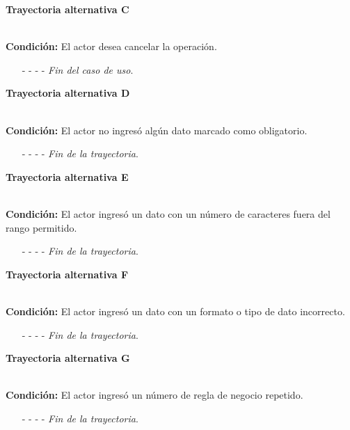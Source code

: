 \hypertarget{CU8-2:TAC}{\textbf{Trayectoria alternativa C}}\\
\noindent \textbf{Condición:} El actor desea cancelar la operación.
\begin{enumerate}
	\UCpaso[\UCactor] Solicita cancelar la operación oprimiendo el botón  de la pantalla 
	\UCpaso[\UCsist] Muestra la pantalla .
	\item[- -] - - {\em {Fin del caso de uso}}.%
\end{enumerate}
\hypertarget{CU8-2:TAD}{\textbf{Trayectoria alternativa D}}\\
\noindent \textbf{Condición:} El actor no ingresó algún dato marcado como obligatorio.
\begin{enumerate}
	\UCpaso[\UCsist] Muestra el mensaje  señalando el campo que presenta el error en la pantalla .
	\UCpaso Regresa al paso \ref{CU8.2-P5} de la trayectoria principal.
	\item[- -] - - {\em {Fin de la trayectoria}}.%
\end{enumerate}
\hypertarget{CU8-2:TAE}{\textbf{Trayectoria alternativa E}}\\
\noindent \textbf{Condición:} El actor ingresó un dato con un número de caracteres fuera del rango permitido.
\begin{enumerate}
	\UCpaso[\UCsist] Muestra el mensaje  señalando el campo que presenta el error en la pantalla .
	\UCpaso Regresa al paso \ref{CU8.2-P5} de la trayectoria principal.
	\item[- -] - - {\em {Fin de la trayectoria}}.%
\end{enumerate}
\hypertarget{CU8-2:TAF}{\textbf{Trayectoria alternativa F}}\\
\noindent \textbf{Condición:} El actor ingresó un dato con un formato o tipo de dato incorrecto.
\begin{enumerate}
	\UCpaso[\UCsist] Muestra el mensaje  señalando el campo que presenta el error en la pantalla .
	\UCpaso Regresa al paso \ref{CU8.2-P5} de la trayectoria principal.
	\item[- -] - - {\em {Fin de la trayectoria}}.
\end{enumerate}
\hypertarget{CU8-2:TAG}{\textbf{Trayectoria alternativa G}}\\
\noindent \textbf{Condición:} El actor ingresó un número de regla de negocio repetido.
\begin{enumerate}
	\UCpaso[\UCsist] Muestra el mensaje  señalando el campo que presenta la duplicidad en la pantalla .
	\UCpaso Regresa al paso \ref{CU8.2-P5} de la trayectoria principal.
	\item[- -] - - {\em {Fin de la trayectoria}}.
\end{enumerate}

